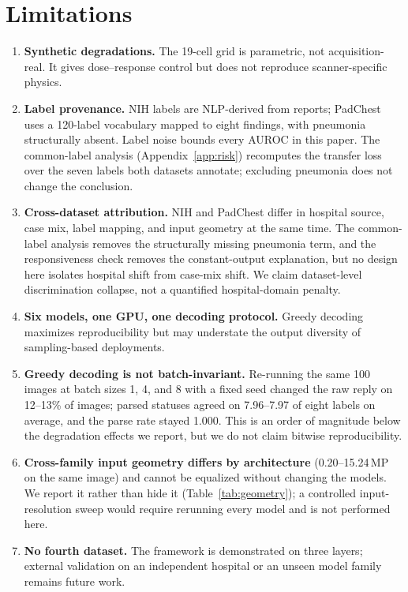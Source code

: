 \section*{Limitations}
\label{sec:limitations}

\begin{enumerate}[leftmargin=1.2em,itemsep=2pt,topsep=2pt]
\item \textbf{Synthetic degradations.} The 19-cell grid is parametric, not acquisition-real. It gives dose--response control but does not reproduce scanner-specific physics.
\item \textbf{Label provenance.} NIH labels are NLP-derived from reports; PadChest uses a 120-label vocabulary mapped to eight findings, with pneumonia structurally absent. Label noise bounds every AUROC in this paper. The common-label analysis (Appendix~\ref{app:risk}) recomputes the transfer loss over the seven labels both datasets annotate; excluding pneumonia does not change the conclusion.
\item \textbf{Cross-dataset attribution.} NIH and PadChest differ in hospital source, case mix, label mapping, and input geometry at the same time. The common-label analysis removes the structurally missing pneumonia term, and the responsiveness check removes the constant-output explanation, but no design here isolates hospital shift from case-mix shift. We claim dataset-level discrimination collapse, not a quantified hospital-domain penalty.
\item \textbf{Six models, one GPU, one decoding protocol.} Greedy decoding maximizes reproducibility but may understate the output diversity of sampling-based deployments.
\item \textbf{Greedy decoding is not batch-invariant.} Re-running the same 100 images at batch sizes 1, 4, and 8 with a fixed seed changed the raw reply on 12--13\% of images; parsed statuses agreed on 7.96--7.97 of eight labels on average, and the parse rate stayed 1.000. This is an order of magnitude below the degradation effects we report, but we do not claim bitwise reproducibility.
\item \textbf{Cross-family input geometry differs by architecture} (0.20--15.24\,MP on the same image) and cannot be equalized without changing the models. We report it rather than hide it (Table~\ref{tab:geometry}); a controlled input-resolution sweep would require rerunning every model and is not performed here.
\item \textbf{No fourth dataset.} The framework is demonstrated on three layers; external validation on an independent hospital or an unseen model family remains future work.

\end{enumerate}
